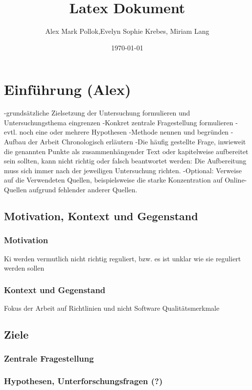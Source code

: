 \documentclass[a4paper, 12pt]{article}
\begin{document}
\title{Latex Dokument}
\author{Alex Mark Pollok,Evelyn Sophie Krebes, Miriam Lang}
\date{\today}
\maketitle

\tableofcontents

\section{Einführung (Alex)}
-grundsätzliche Zielsetzung der Untersuchung formulieren und Untersuchungsthema eingrenzen
	-Konkret zentrale Fragestellung formulieren
	-evtl. noch eine oder mehrere Hypothesen
	-Methode nennen und begründen
	- Aufbau der Arbeit Chronologisch erläutern
	-Die häufig gestellte Frage, inwieweit die genannten Punkte als zusammenhängender Text oder kapitelweise aufbereitet sein sollten, kann nicht richtig oder falsch beantwortet werden: Die Aufbereitung muss sich immer nach der jeweiligen Untersuchung richten.
	-Optional: Verweise auf die Verwendeten Quellen, beispielsweise die starke Konzentration auf Online-Quellen aufgrund fehlender anderer Quellen.

\subsection{Motivation, Kontext und Gegenstand}
\subsubsection{Motivation}
Ki werden vermutlich nicht richtig reguliert, bzw. es ist unklar wie sie reguliert werden sollen
\subsubsection{Kontext und Gegenstand}
Fokus der Arbeit auf Richtlinien und nicht Software Qualitätsmerkmale
\subsection{Ziele}
\subsubsection{Zentrale Fragestellung}
\subsubsection{Hypothesen, Unterforschungsfragen (?)}
\end{document}
